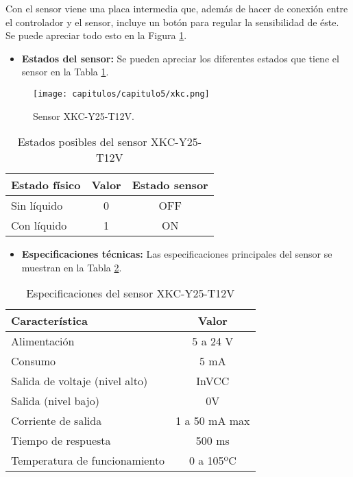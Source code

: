 \begin{enumerate}
Con el sensor viene una placa intermedia que, además de hacer de conexión entre el controlador y el sensor, incluye un botón para regular la sensibilidad de éste. Se puede apreciar todo esto en la Figura \ref{fig:XKC-Y25-T12V}.

\begin{itemize}
    \item \textbf{Estados del sensor:} Se pueden apreciar los diferentes estados que tiene el sensor en la Tabla \ref{tab:XKC-Y25-T12V}.
\end{itemize}

\begin{figure}[h] 
    \centering
    \texttt{[image: capitulos/capitulo5/xkc.png]}
    \caption{Sensor XKC-Y25-T12V.}
    \label{fig:XKC-Y25-T12V}
\end{figure}

\begin{table}[h]
    \centering
    \begin{tabular}{|l|c|c|}
        \rowcolor[gray]{.5}
        \hline
         \color{white}Estado físico&\color{white}Valor&\color{white}Estado sensor \\
         \hline
         Sin líquido&0&OFF \\
         \hline
         Con líquido&1&ON  \\
         \hline
    \end{tabular}
    \caption{Estados posibles del sensor XKC-Y25-T12V}
    \label{tab:XKC-Y25-T12V}
\end{table}

\clearpage
\begin{itemize}
    \item \textbf{Especificaciones técnicas:} Las especificaciones principales del sensor se muestran en la Tabla \ref{tab:XKC-Y25-T12Vesp}.
\end{itemize}

\begin{table}[h]
    \centering
    \begin{tabular}{|l|c|}
        \rowcolor[gray]{.5}
        \hline
            \color{white}Característica&\color{white}Valor  \\
        \hline
            Alimentación & 5 a 24 V  \\
        \hline    
            Consumo&5 mA  \\
        \hline    
            Salida de voltaje (nivel alto)&InVCC  \\
        \hline    
            Salida (nivel bajo) & 0V  \\
        \hline    
            Corriente de salida& 1 a 50 mA max  \\
        \hline    
            Tiempo de respuesta& 500 ms  \\
        \hline    
            Temperatura de funcionamiento& 0 a 105ºC  \\
         \hline
    \end{tabular}
    \caption{Especificaciones del sensor XKC-Y25-T12V}
    \label{tab:XKC-Y25-T12Vesp}
\end{table}
\end{enumerate}

